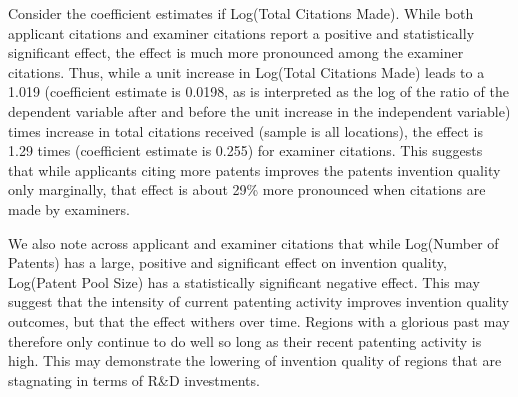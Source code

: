 \documentclass[12pt,letterpaper]{article}
\begin{document}
Consider the coefficient estimates if Log(Total Citations Made). While both applicant citations and examiner citations report a positive and statistically significant effect, the effect is much more pronounced among the examiner citations. Thus, while a unit increase in Log(Total Citations Made) leads to a 1.019 (coefficient estimate is 0.0198, as is interpreted as the log of the ratio of the dependent variable after and before the unit increase in the independent variable) times increase in total citations received (sample is all locations), the effect is 1.29 times (coefficient estimate is 0.255) for examiner citations. This suggests that while applicants citing more patents improves the patent\textquotesingle s invention quality only marginally, that effect is about 29\% more pronounced when citations are made by examiners.

We also note across applicant and examiner citations that while Log(Number of Patents) has a large, positive and significant effect on invention quality, Log(Patent Pool Size) has a statistically significant negative effect. This may suggest that the intensity of current patenting activity improves invention quality outcomes, but that the effect withers over time. Regions with a glorious past may therefore only continue to do well so long as their recent patenting activity is high. This may demonstrate the lowering of invention quality of regions that are stagnating in terms of R\&D investments.
\end{document}
